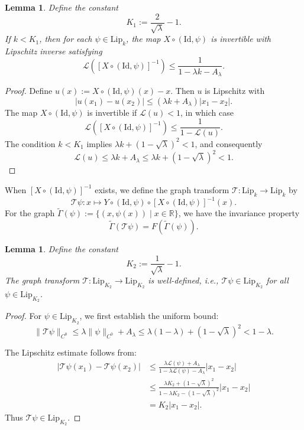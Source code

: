 \documentclass{amsart}
\newcommand{\R}{\mathbb{R}}
\newcommand{\Lip}{\mathrm{Lip}}
\newtheorem{Lemma}[Definition]{Lemma}
\theoremstyle{definition}
\begin{document}
\begin{Lemma}\label{invertib}
Define the constant
\[
K_1 := \frac{2}{\sqrt{\lambda}} - 1.
\]
If $k < K_1$, then for each $\psi \in \Lip_k$, the map $X \circ (\mathrm{Id}, \psi)$ is invertible with Lipschitz inverse satisfying
\[
\mathcal{L}\left([X \circ (\mathrm{Id}, \psi)]^{-1}\right) \leq \frac{1}{1 - \lambda k - A_\lambda}.
\]
\end{Lemma}

\begin{proof}
Define $u(x) := X \circ (\mathrm{Id}, \psi)(x) - x$. Then $u$ is Lipschitz with
\[
|u(x_1) - u(x_2)| \leq (\lambda k + A_\lambda)|x_1 - x_2|.
\]
The map $X \circ (\mathrm{Id}, \psi)$ is invertible if $\mathcal{L}(u) < 1$, in which case
\[
\mathcal{L}\left([X \circ (\mathrm{Id}, \psi)]^{-1}\right) \leq \frac{1}{1 - \mathcal{L}(u)}.
\]
The condition $k < K_1$ implies $\lambda k + (1 - \sqrt{\lambda})^2 < 1$, and consequently
\[
\mathcal{L}(u) \leq \lambda k + A_\lambda \leq \lambda k + (1 - \sqrt{\lambda})^2 < 1.
\]
\end{proof}

When $[X \circ (\mathrm{Id}, \psi)]^{-1}$ exists, we define the graph transform $\mathcal{T}: \Lip_k \to \Lip_k$ by
\[
\mathcal{T}\psi : x \mapsto Y \circ (\mathrm{Id}, \psi) \circ [X \circ (\mathrm{Id}, \psi)]^{-1}(x).
\]
For the graph $\tilde{\Gamma}(\psi) := \{(x, \psi(x)) \mid x \in \R\}$, we have the invariance property
\[
\tilde{\Gamma}(\mathcal{T}\psi) = F(\tilde{\Gamma}(\psi)).
\]

\begin{Lemma}\label{welld}
Define the constant
\[
K_2 := \frac{1}{\sqrt{\lambda}} - 1.
\]
The graph transform $\mathcal{T}: \Lip_{K_2} \to \Lip_{K_2}$ is well-defined, i.e., $\mathcal{T}\psi \in \Lip_{K_2}$ for all $\psi \in \Lip_{K_2}$.
\end{Lemma}

\begin{proof}
For $\psi \in \Lip_{K_2}$, we first establish the uniform bound:
\[
\|\mathcal{T}\psi\|_{C^0} \leq \lambda \|\psi\|_{C^0} + A_\lambda \leq \lambda(1-\lambda) + (1 - \sqrt{\lambda})^2 < 1-\lambda.
\]

The Lipschitz estimate follows from:
\begin{align*}
|\mathcal{T}\psi(x_1) - \mathcal{T}\psi(x_2)|
&\leq \frac{\lambda \mathcal{L}(\psi) + A_\lambda}{1 - \lambda \mathcal{L}(\psi) - A_\lambda}|x_1 - x_2| \\
&\leq \frac{\lambda K_2 + (1 - \sqrt{\lambda})^2}{1 - \lambda K_2 - (1 - \sqrt{\lambda})^2}|x_1 - x_2| \\
&= K_2 |x_1 - x_2|.
\end{align*}
Thus $\mathcal{T}\psi \in \Lip_{K_2}$.
\end{proof}
\end{document}
